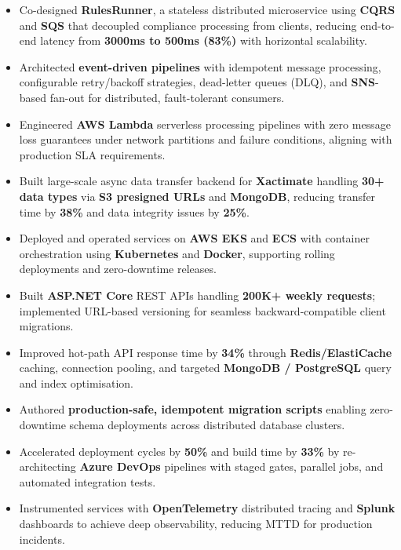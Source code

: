 \documentclass[letterpaper,10pt]{article}
\begin{document}
\begin{itemize}[leftmargin=*]
    \item Co-designed \textbf{RulesRunner}, a stateless distributed microservice using \textbf{CQRS} and \textbf{SQS} that decoupled compliance processing from clients, reducing end-to-end latency from \textbf{3000ms to 500ms (83\%)} with horizontal scalability.
    \item Architected \textbf{event-driven pipelines} with idempotent message processing, configurable retry/backoff strategies, dead-letter queues (DLQ), and \textbf{SNS}-based fan-out for distributed, fault-tolerant consumers.
    \item Engineered \textbf{AWS Lambda} serverless processing pipelines with zero message loss guarantees under network partitions and failure conditions, aligning with production SLA requirements.
    \item Built large-scale async data transfer backend for \textbf{Xactimate} handling \textbf{30+ data types} via \textbf{S3 presigned URLs} and \textbf{MongoDB}, reducing transfer time by \textbf{38\%} and data integrity issues by \textbf{25\%}.
    \item Deployed and operated services on \textbf{AWS EKS} and \textbf{ECS} with container orchestration using \textbf{Kubernetes} and \textbf{Docker}, supporting rolling deployments and zero-downtime releases.
    \item Built \textbf{ASP.NET Core} REST APIs handling \textbf{200K+ weekly requests}; implemented URL-based versioning for seamless backward-compatible client migrations.
    \item Improved hot-path API response time by \textbf{34\%} through \textbf{Redis/ElastiCache} caching, connection pooling, and targeted \textbf{MongoDB / PostgreSQL} query and index optimisation.
    \item Authored \textbf{production-safe, idempotent migration scripts} enabling zero-downtime schema deployments across distributed database clusters.
    \item Accelerated deployment cycles by \textbf{50\%} and build time by \textbf{33\%} by re-architecting \textbf{Azure DevOps} pipelines with staged gates, parallel jobs, and automated integration tests.
    \item Instrumented services with \textbf{OpenTelemetry} distributed tracing and \textbf{Splunk} dashboards to achieve deep observability, reducing MTTD for production incidents.
\end{itemize}
\end{document}
